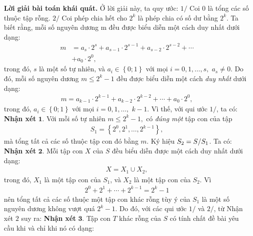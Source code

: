 \begin{multicols}{2}
	\vskip 0.05cm
	\textbf{\color{thachthuctoanhoc}Lời giải bài toán khái quát.}
	\vskip 0.05cm
	Ở lời giải này, ta quy ước:
	\vskip 0.05cm
	$1/$ Coi $0$ là tổng các số thuộc tập rỗng.
	\vskip 0.05cm
	$2/$ Coi phép chia hết cho $2^k$  là phép chia có số dư bằng  $2^k$.
	\vskip 0.05cm
	Ta biết rằng, mỗi số nguyên dương m đều được biểu diễn một cách duy nhất dưới dạng:
	\begin{align*}
		m &= {a_s} \cdot {2^s} + {a_{s - 1}} \cdot {2^{s - 1}} + {a_{s - 2}} \cdot {2^{s - 2}} +  \cdots  \\
		&+ {a_0} \cdot {2^0},
	\end{align*}
	trong đó, $s$ là một số tự nhiên, và  ${a_i} \in \left\{ {0;1} \right\}$ với mọi  $i = 0,1, \ldots ,s, $ ${a_s} \ne 0.$
	\vskip 0.05cm  
	Do đó, mỗi số nguyên dương  $m \le {2^k} - 1$ đều được biểu diễn một cách \textit{duy nhất} dưới dạng:
	\begin{align*}
		m = {a_{k - 1}} \cdot {2^{k - 1}} + {a_{k - 2}} \cdot {2^{k - 2}} +  \cdots  + {a_0} \cdot {2^0},
	\end{align*}
	trong đó, ${a_i} \in \left\{ {0;1} \right\}$  với mọi  $i = 0,1, \ldots,$ $k - 1$.
	\vskip 0.05cm
	Vì thế, với qui ước $1/$, ta có:
	\vskip 0.05cm
	\textbf{\color{thachthuctoanhoc}Nhận xét} $\pmb{1.}$ Với mỗi số tự nhiên $m \le {2^k} - 1,$  có \textit{đúng một} tập con của tập
	\begin{align*}
		{S_1} = \left\{ {{2^0},{2^1}, \ldots ,{2^{k - 1}}} \right\},
	\end{align*}
	mà tổng tất cả các số thuộc tập con đó bằng $m$.
	\vskip 0.05cm
	Ký hiệu ${S_2} = {S \mathord{\left/
			{\vphantom {S {{S_1}}}} \right.
			\kern-\nulldelimiterspace} {{S_1}}}$.  Ta có:
	\vskip 0.05cm
	\textbf{\color{thachthuctoanhoc}Nhận xét} $\pmb{2.}$ Mỗi tập con $X$ của $S$ đều biểu diễn được một cách duy nhất dưới dạng:
	\begin{align*}
		X = {X_1} \cup {X_2},
	\end{align*}
	trong đó, $X_1$  là một tập con của  $S_1$, và $X_2$  là một tập con của $S_2$.
	\vskip 0.05cm 
	Vì
	\begin{align*}
		{2^0} + {2^1} +  \cdots  + {2^{k - 1}} = {2^k} - 1
	\end{align*}
	nên tổng tất cả các số thuộc một tập con khác rỗng tùy ý của $S_1$  là một số nguyên dương không vượt quá $2^k -1$.  Do đó, với các qui ước $1/$ và $2/$, từ Nhận xét $2$ suy ra:
	\vskip 0.05cm
	\textbf{\color{thachthuctoanhoc}Nhận xét} $\pmb{3.}$ Tập con $T$ khác rỗng của $S$ có tính chất đề bài yêu cầu khi và chỉ khi nó có dạng:

\end{multicols}
